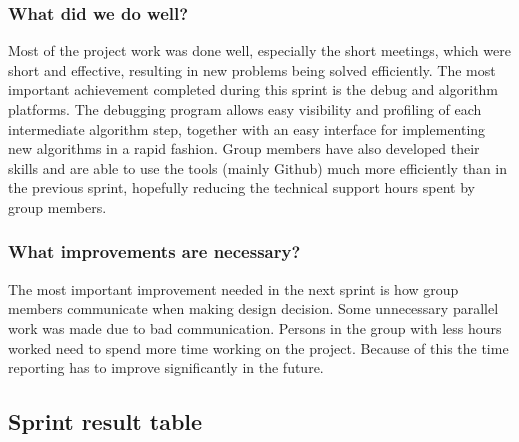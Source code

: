 \subsubsection{What did we do well?}
Most of the project work was done well, especially the short meetings, which were short and effective, resulting in new problems being solved efficiently. The most important achievement completed during this sprint is the debug and algorithm platforms. The debugging program allows easy visibility and profiling of each intermediate algorithm step, together with an easy interface for implementing new algorithms in a rapid fashion. Group members have also developed their skills and are able to use the tools (mainly Github) much more efficiently than in the previous sprint, hopefully reducing the technical support hours spent by group members.

\subsubsection{What improvements are necessary?}
The most important improvement needed in the next sprint is how group members communicate when making design decision. Some unnecessary parallel work was made due to bad communication. Persons in the group with less hours worked need to spend more time working on the project. Because of this the time reporting has to improve significantly in the future.
\newpage

\subsection{Sprint result table}

\resulttable
{
}
\newpage

